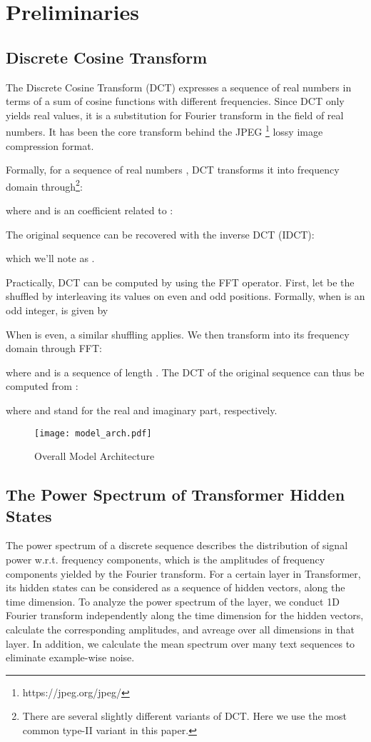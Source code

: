 \documentclass[11pt]{article}
\begin{document}
\section{Preliminaries}





\subsection{Discrete Cosine Transform}
The Discrete Cosine Transform (DCT) expresses a sequence of real numbers in terms of a sum of cosine functions with different frequencies. Since DCT only yields real values, it is a substitution for Fourier transform in the field of real numbers. It has been the core transform behind the JPEG \footnote{https://jpeg.org/jpeg/} lossy image compression format. 

Formally, for a sequence of  real numbers , DCT transforms it into frequency domain through\footnote{There are several slightly different variants of DCT. Here we use the most common type-II variant in this paper.}:

where  and  is an coefficient related to :



The original sequence  can be recovered with the inverse DCT (IDCT):

which we'll note as .

Practically, DCT can be computed by using the FFT operator. First, let  be the shuffled  by interleaving its values on even and odd positions. Formally, when  is an odd integer,  is given by

When  is even, a similar shuffling applies. We then transform  into its frequency domain through FFT:

where  and  is a sequence of length . The DCT of the original sequence  can thus be computed from :

where  and  stand for the real and imaginary part, respectively.

\begin{figure*}[ht]
\centering
\texttt{[image: model\_arch.pdf]} \caption{Overall Model Architecture}
\label{fig: model_arch}
\end{figure*}


\subsection{The Power Spectrum of Transformer Hidden States}
The power spectrum of a discrete sequence describes the distribution of signal power w.r.t. frequency components, which is the amplitudes of frequency components yielded by the Fourier transform. For a certain layer in Transformer, its hidden states can be considered as a sequence of hidden vectors, along the time dimension. To analyze the power spectrum of the layer, we conduct 1D Fourier transform independently along the time dimension for the hidden vectors, calculate the corresponding amplitudes, and avreage over all dimensions in that layer. In addition, we calculate the mean spectrum over many text sequences to eliminate example-wise noise. 
\end{document}
